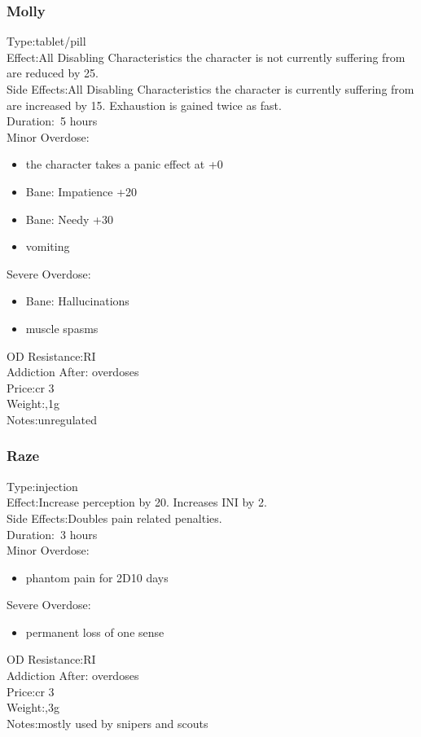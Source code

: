\subsubsection{Molly}
Type:\tab tablet/pill\\
Effect:\tab All Disabling Characteristics the character is not currently suffering from are reduced by 25.\\
Side Effects:\tab All Disabling Characteristics the character is currently suffering from are increased by 15. Exhaustion is gained twice as fast.\\
Duration:\tab ~5 hours\\
Minor Overdose:\\
\begin{itemize}
	\setlength\itemsep{-8mm}
	\vspace{-12mm}
	\item the character takes a panic effect at +0
	\item Bane: Impatience +20
	\item Bane: Needy +30
	\item vomiting
\end{itemize}
Severe Overdose:\\
\begin{itemize}
	\setlength\itemsep{-8mm}
	\vspace{-12mm}
	\item Bane: Hallucinations
	\item muscle spasms
\end{itemize}
OD Resistance:\tab RI\\
Addiction After: overdoses\\
Price:\tab cr 3\\
Weight:,1g\\
Notes:\tab unregulated


\subsubsection{Raze}
Type:\tab injection\\
Effect:\tab Increase perception by 20. Increases INI by 2.\\
Side Effects:\tab Doubles pain related penalties.\\
Duration:\tab ~3 hours\\
Minor Overdose:\\
\begin{itemize}
	\setlength\itemsep{-8mm}
	\vspace{-12mm}
	\item phantom pain for 2D10 days
\end{itemize}
Severe Overdose:\\
\begin{itemize}
	\setlength\itemsep{-8mm}
	\vspace{-12mm}
	\item permanent loss of one sense
\end{itemize}
OD Resistance:\tab RI\\
Addiction After: overdoses\\
Price:\tab cr 3\\
Weight:,3g\\
Notes:\tab mostly used by snipers and scouts


